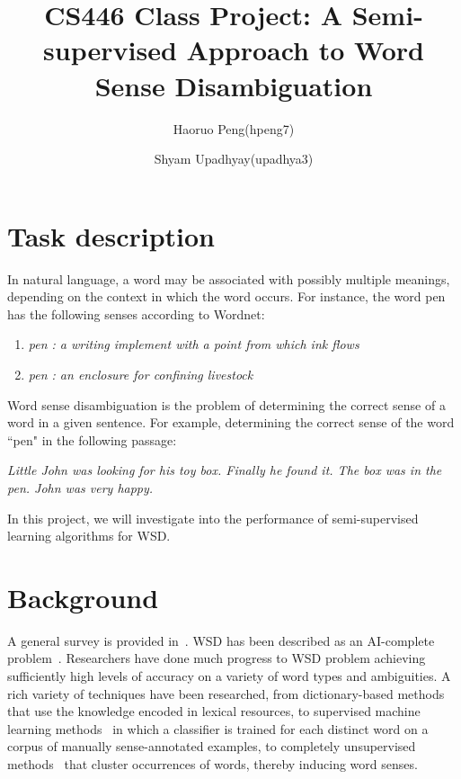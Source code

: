 \documentclass[11pt,letterpaper]{article}
\begin{document}
\title{CS446 Class Project: A Semi-supervised Approach to Word Sense Disambiguation}
\author{Haoruo Peng(hpeng7) \and Shyam Upadhyay(upadhya3)}
\maketitle

\section*{Task description}
In natural language, a word may be associated with possibly multiple meanings, depending on the context in which the word occurs. For instance, the word pen has the following senses according to Wordnet:
\begin{enumerate}
\item \emph{pen : a writing implement with a point from which ink flows}
\item \emph{pen : an enclosure for confining livestock}
\end{enumerate}

Word sense disambiguation is the problem of determining the correct sense of a word in a given sentence. For example, determining the correct sense of the word ``pen" in the following passage:

\emph{Little John was looking for his toy box. Finally he found it. The box was in the pen. John was very happy.}

In this project, we will investigate into the performance of semi-supervised learning algorithms for WSD.

\section*{Background}
A general survey is provided in~\cite{navigli2009word}. WSD has been described as an AI-complete problem~\cite{mallery1988thinking}. Researchers have done much progress to WSD problem achieving sufficiently high levels of accuracy on a variety of word types and ambiguities. A rich variety of techniques have been researched, from dictionary-based methods~\cite{mihalcea2007using} that use the knowledge encoded in lexical resources, to supervised machine learning methods~\cite{manning1999foundations} in which a classifier is trained for each distinct word on a corpus of manually sense-annotated examples, to completely unsupervised methods~\cite{yarowsky1995unsupervised} that cluster occurrences of words, thereby inducing word senses.
\end{document}
